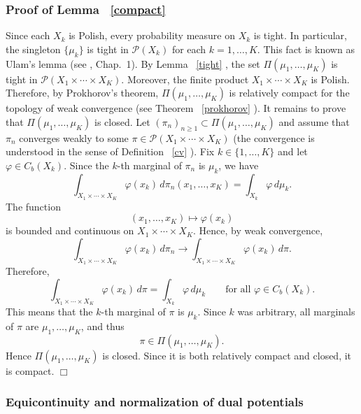 \documentclass[twoside,11pt,a4paper]{article}
\newcommand*{\SavedRef}{}
\let\SavedRef\ref
\renewcommand*{\ref}[1]{  \begingroup
    \hypersetup{
      linkcolor=linkequation,
      linkbordercolor=linkequation,
    }    \SavedRef{#1}  \endgroup
}
\begin{document}
\subsubsection*{Proof of Lemma~\ref{compact}}
Since each \(X_k\) is Polish, every probability measure on \(X_k\) is tight.
In particular, the singleton \(\{\mu_k\}\) is tight in \(\mathcal P(X_k)\) for
each \(k=1,\ldots,K\).  This fact is known as Ulam’s lemma (see \cite{Krylov2002}, Chap.~1). By Lemma~\ref{tight}, the set
\(\Pi(\mu_1,\ldots,\mu_K)\) is tight in
\(\mathcal P(X_1\times\cdots\times X_K)\).
Moreover, the finite product \(X_1\times\cdots\times X_K\) is Polish.
Therefore, by Prokhorov's theorem, \(\Pi(\mu_1,\ldots,\mu_K)\) is relatively
compact for the topology of weak convergence (see Theorem~\ref{prokhorov}).
It remains to prove that \(\Pi(\mu_1,\ldots,\mu_K)\) is closed. Let
\((\pi_n)_{n\ge1}\subset \Pi(\mu_1,\ldots,\mu_K)\) and assume that
\(\pi_n\) converges weakly to some
\(\pi\in\mathcal P(X_1\times\cdots\times X_K)\) (the convergence is understood in the sense of
Definition~\ref{cv}).  Fix
\(k\in\{1,\ldots,K\}\) and let \(\varphi\in C_b(X_k)\). Since the \(k\)-th
marginal of \(\pi_n\) is \(\mu_k\), we have
\[
\int_{X_1\times\cdots\times X_K}
\varphi(x_k)\,d\pi_n(x_1,\ldots,x_K)
=
\int_{X_k}\varphi\,d\mu_k .
\]
The function
\[
(x_1,\ldots,x_K)\longmapsto \varphi(x_k)
\]
is bounded and continuous on \(X_1\times\cdots\times X_K\). Hence, by weak
convergence,
\[
\int_{X_1\times\cdots\times X_K}
\varphi(x_k)\,d\pi_n
\longrightarrow
\int_{X_1\times\cdots\times X_K}
\varphi(x_k)\,d\pi .
\]
Therefore,
\[
\int_{X_1\times\cdots\times X_K}
\varphi(x_k)\,d\pi
=
\int_{X_k}\varphi\,d\mu_k
\qquad
\text{for all } \varphi\in C_b(X_k).
\]
This means that the \(k\)-th marginal of \(\pi\) is \(\mu_k\). Since \(k\) was
arbitrary, all marginals of \(\pi\) are \(\mu_1,\ldots,\mu_K\), and thus
\[
\pi\in\Pi(\mu_1,\ldots,\mu_K).
\]
Hence \(\Pi(\mu_1,\ldots,\mu_K)\) is closed. Since it is both relatively compact
and closed, it is compact.
\hfill\(\Box\)






\subsubsection{Equicontinuity and normalization of dual potentials}\label{eq_norm}
\end{document}
